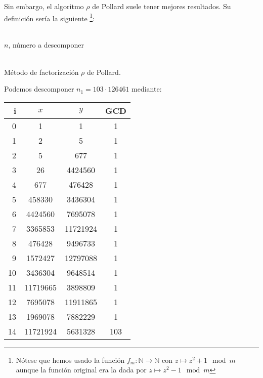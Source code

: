\begin{enumerate}
\begin{enumerate}
			Sin embargo, el algoritmo $\rho$ de Pollard suele tener mejores resultados. Su definición sería la
			siguiente \footnote{Nótese que hemos usado la función $f_m: \mathbb{N} \rightarrow \mathbb{N}$
			con $z \mapsto z^2+1 \mod{m}$ aunque la función original era la dada por $z \mapsto z^2-1 \mod{m}$}:
			\begin{algorithm}[H]
			\begin{algorithmic}[1]
				\REQUIRE \ \\
					\texttt{$n$}, número a descomponer \\ \
				\ENDWHILE
				\ELSE
				\ENDIF
			\end{algorithmic}
			\caption{Método de factorización $\rho$ de Pollard.}
			\label{Rho-Pollard}
			\end{algorithm}
			
			Podemos descomponer $n_1 = 103 \cdot 126461$ mediante:
			\begin{center}
			\begin{tabular}{ | r | c | c | c |}
				\hline
				i   & $x$       & $y$       & GCD \\
				\hline
				0   & 1         & 1         & 1 \\
				1   & 2         & 5         & 1 \\
				2   & 5         & 677       & 1 \\
				3   & 26        & 4424560   & 1 \\
				4   & 677       & 476428    & 1 \\
				5   & 458330    & 3436304   & 1 \\
				6   & 4424560   & 7695078   & 1 \\
				7   & 3365853   & 11721924  & 1 \\
				8   & 476428    & 9496733   & 1 \\
				9   & 1572427   & 12797088  & 1 \\
				10  & 3436304   & 9648514   & 1 \\
				11  & 11719665  & 3898809   & 1 \\
				12  & 7695078   & 11911865  & 1 \\
				13  & 1969078   & 7882229   & 1 \\
				14  & 11721924  & 5631328   & 103 \\
				\hline
			\end{tabular}
			\end{center}


\end{enumerate}
\end{enumerate}
